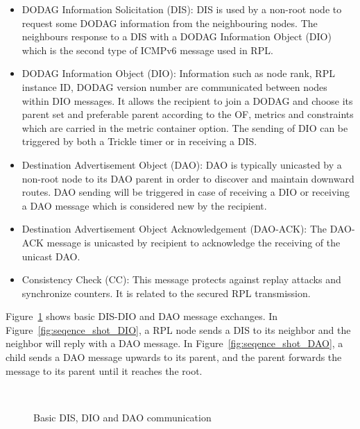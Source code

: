 \begin{itemize}
\item DODAG Information Solicitation (DIS): DIS is used by a non-root node to request some DODAG information from the neighbouring nodes. The neighbours response to a DIS with a DODAG Information Object (DIO) which is the second type of ICMPv6 message used in RPL.
\newline

\item DODAG Information Object (DIO): Information such as node rank, RPL instance ID, DODAG version number are communicated between nodes within DIO messages. It allows the recipient to join a DODAG and choose its parent set and preferable parent according to the OF, metrics and constraints which are carried in the metric container option. The sending of DIO can be triggered by both a Trickle timer or in receiving a DIS.
\newline

\item Destination Advertisement Object (DAO): DAO is typically unicasted by a non-root node to its DAO parent in order to discover and maintain downward routes. DAO sending will be triggered in case of receiving a DIO or receiving a DAO message which is considered new by the recipient.
\newline

\item Destination Advertisement Object Acknowledgement (DAO-ACK): The DAO-ACK message is unicasted by recipient to acknowledge the receiving of the unicast DAO.
\newline

\item Consistency Check (CC): This message protects against replay attacks and synchronize counters. It is related to the secured RPL transmission.
\end{itemize}
\newline

Figure~\ref{fig:DIS/DIO/DAO} shows basic DIS-DIO and DAO message exchanges. In Figure~\ref{fig:seqence_shot_DIO}, a RPL node sends a DIS to its neighbor and the neighbor will reply with a DAO message. In Figure~\ref{fig:seqence_shot_DAO}, a child sends a DAO message upwards to its parent, and the parent forwards the message to its parent until it reaches the root. 

\begin{figure}[htbp]
  \begin{center}
    \leavevmode
    \\
    \caption{Basic DIS, DIO and DAO communication}
    \label{fig:DIS/DIO/DAO}
  \end{center}
\end{figure}

